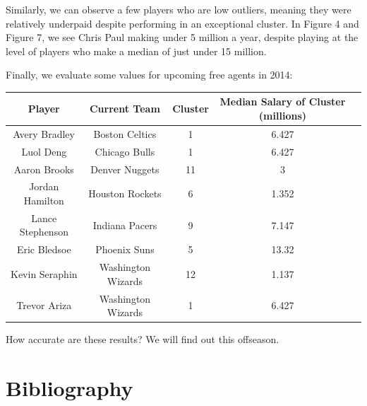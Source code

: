 \documentclass{article}
\begin{document}
Similarly, we can observe a few players who are low outliers, meaning they were relatively underpaid despite performing in an exceptional cluster. In Figure 4 and Figure 7, we see Chris Paul making under 5 million a year, despite playing at the level of players who make a median of just under 15 million.

Finally, we evaluate some values for upcoming free agents in 2014:

\begin{center}
\begin{tabular}{|c | c | c | c | c|}
\hline
Player & Current Team & Cluster & Median Salary of Cluster (millions)\\
\hline
\hline
Avery Bradley & Boston Celtics & 1 & 6.427 \\
\hline
Luol Deng & Chicago Bulls & 1 & 6.427 \\
\hline
Aaron Brooks & Denver Nuggets & 11 & 3 \\
\hline
Jordan Hamilton & Houston Rockets & 6 & 1.352 \\
\hline
Lance Stephenson & Indiana Pacers & 9 & 7.147 \\
\hline
Eric Bledsoe & Phoenix Suns & 5 & 13.32 \\
\hline
Kevin Seraphin & Washington Wizards & 12 & 1.137 \\
\hline
Trevor Ariza & Washington Wizards & 1 & 6.427 \\
\hline
\end{tabular}
\end{center}

How accurate are these results? We will find out this offseason.

\section{Bibliography}

\printbibliography
\end{document}
